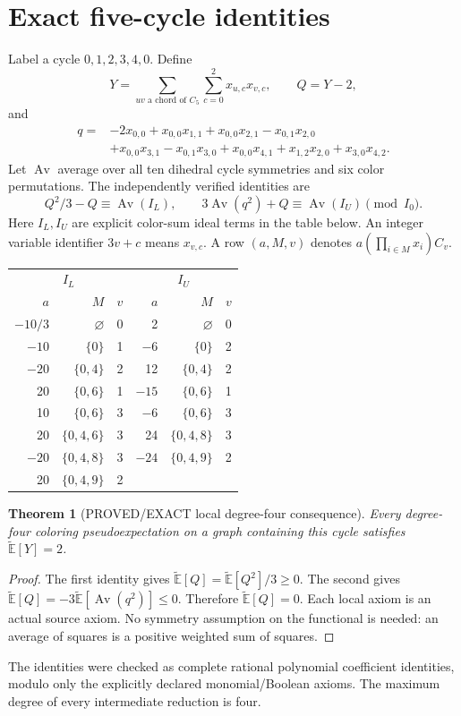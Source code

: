 \documentclass[11pt]{article}
\newtheorem{theorem}{Theorem}
\newcommand{\E}{\widetilde{\mathbb E}}
\newcommand{\av}{\operatorname{Av}}
\begin{document}
\section{Exact five-cycle identities}
Label a cycle $0,1,2,3,4,0$. Define
\[
 Y=\sum_{uv\text{ a chord of }C_5}\sum_{c=0}^2x_{u,c}x_{v,c},\qquad Q=Y-2,
\]
and
\begin{align*}
 q={}&-2x_{0,0}+x_{0,0}x_{1,1}+x_{0,0}x_{2,1}-x_{0,1}x_{2,0}\\
 &+x_{0,0}x_{3,1}-x_{0,1}x_{3,0}+x_{0,0}x_{4,1}
 +x_{1,2}x_{2,0}+x_{3,0}x_{4,2}.
\end{align*}
Let $\av$ average over all ten dihedral cycle symmetries and six color permutations. The independently verified identities are
\[
 Q^2/3-Q\equiv\av(I_L),\qquad
 3\av(q^2)+Q\equiv\av(I_U)\pmod{I_0}.
\]
Here $I_L,I_U$ are explicit color-sum ideal terms in the table below. An integer variable identifier $3v+c$ means $x_{v,c}$. A row $(a,M,v)$ denotes $a(\prod_{i\in M}x_i)C_v$.
\begin{center}\begin{tabular}{rrr@{\qquad}rrr}
\toprule
\multicolumn{3}{c}{$I_L$}&\multicolumn{3}{c}{$I_U$}\\
$a$&$M$&$v$&$a$&$M$&$v$\\\midrule
$-10/3$&$\varnothing$&0&2&$\varnothing$&0\\
$-10$&$\{0\}$&1&$-6$&$\{0\}$&2\\
$-20$&$\{0,4\}$&2&12&$\{0,4\}$&2\\
20&$\{0,6\}$&1&$-15$&$\{0,6\}$&1\\
10&$\{0,6\}$&3&$-6$&$\{0,6\}$&3\\
20&$\{0,4,6\}$&3&24&$\{0,4,8\}$&3\\
$-20$&$\{0,4,8\}$&3&$-24$&$\{0,4,9\}$&2\\
20&$\{0,4,9\}$&2&&&\\\bottomrule
\end{tabular}\end{center}
\begin{theorem}[PROVED/EXACT local degree-four consequence]
Every degree-four coloring pseudoexpectation on a graph containing this cycle satisfies $\E[Y]=2$.
\end{theorem}
\begin{proof}
The first identity gives $\E[Q]=\E[Q^2]/3\ge0$. The second gives $\E[Q]=-3\E[\av(q^2)]\le0$. Therefore $\E[Q]=0$. Each local axiom is an actual source axiom. No symmetry assumption on the functional is needed: an average of squares is a positive weighted sum of squares.
\end{proof}
The identities were checked as complete rational polynomial coefficient identities, modulo only the explicitly declared monomial/Boolean axioms. The maximum degree of every intermediate reduction is four.
\end{document}
